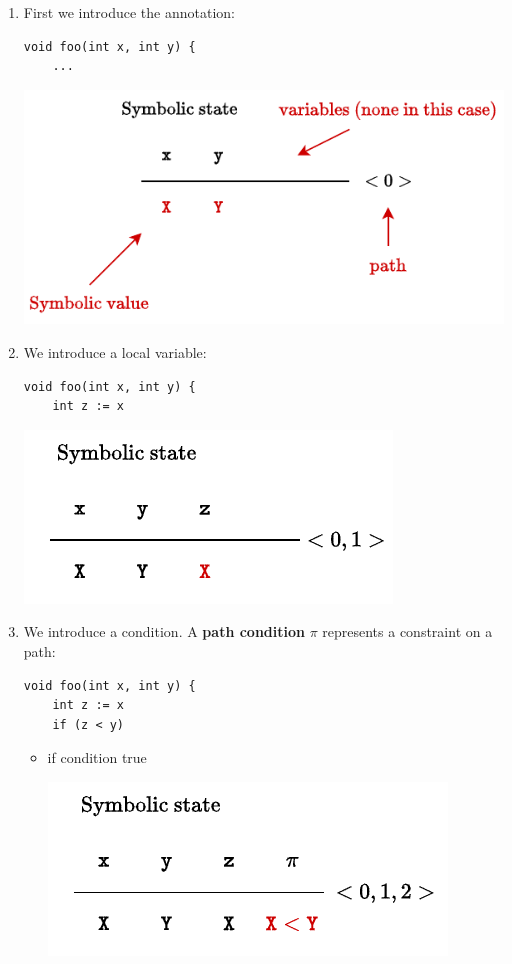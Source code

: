 \begin{examplebox}\label{example: Symbolic Execution}
    \begin{enumerate}
        \item First we introduce the annotation:
        \begin{lstlisting}
void foo(int x, int y) {
    ...\end{lstlisting}
        \begin{center}
            \includegraphics[width=.7\textwidth]{img/symbolic-state-1.pdf}
        \end{center}


        \item We introduce a local variable:
        \begin{lstlisting}
void foo(int x, int y) {
    int z := x\end{lstlisting}
        \begin{center}
            \includegraphics[width=.5\textwidth]{img/symbolic-state-2.pdf}
        \end{center}


        \item We introduce a condition. A \textbf{path condition} $\pi$ represents a constraint on a path:
        \begin{lstlisting}
void foo(int x, int y) {
    int z := x
    if (z < y)\end{lstlisting}
        \begin{itemize}
            \item if condition true
            \begin{center}
                \includegraphics[width=.5\textwidth]{img/symbolic-state-3.pdf}
            \end{center}


\end{itemize}
\end{enumerate}
\end{examplebox}
